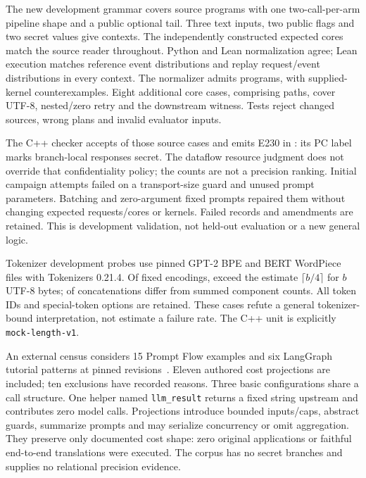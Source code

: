 \documentclass[preprint,12pt,a4paper]{elsarticle}
\begin{document}
The new development grammar covers \evDataflowSourcePrograms{} source programs
with one two-call-per-arm pipeline shape and a public optional tail. Three text
inputs, two public flags and two secret values give
\evDataflowExecutionContexts{} contexts. The independently constructed expected
cores match the source reader throughout. Python and Lean normalization agree;
Lean execution matches reference event distributions and replay request/event
distributions in every context. The normalizer admits \evDataflowAccepted{}
programs, with \evDataflowAcceptedFiniteCounterexamples{} supplied-kernel
counterexamples. Eight additional core cases, comprising
\evDataflowBoundaryPaths{} paths, cover UTF-8, nested/zero retry and the downstream
witness. Tests reject \evDataflowSourceTampersRejected{} changed sources,
\evDataflowAlteredPlansRejected{} wrong plans and
\evDataflowInvalidEvaluatorInputsRejected{} invalid evaluator inputs.

The C++ checker accepts \evDataflowCppAccepted{} of those source cases and emits
E230 in \evDataflowCppSecretArgumentCases{}: its PC label marks branch-local responses
secret. The dataflow resource judgment does not override that confidentiality
policy; the counts are not a precision ranking. Initial campaign attempts failed
on a transport-size guard and unused prompt parameters. Batching and zero-argument
fixed prompts repaired them without changing expected requests/cores or kernels.
Failed records and amendments are retained. This is development validation,
not held-out evaluation or a new general logic.

Tokenizer development probes use pinned GPT-2 BPE and BERT WordPiece files with
Tokenizers 0.21.4. Of \evTokenizerEncodings{} fixed encodings,
\evUnderestimates{} exceed the estimate $\lceil b/4\rceil$ for $b$ UTF-8 bytes;
\evNonadditive{} of \evConcatenations{} concatenations differ from summed
component counts. All token IDs and special-token options are retained. These
cases refute a general tokenizer-bound interpretation, not estimate a failure
rate. The C++ unit is explicitly \texttt{mock-length-v1}.

An external census considers 15 Prompt Flow examples and six LangGraph tutorial
patterns at pinned revisions~\cite{promptflow,langgraph}. Eleven authored cost
projections are included; ten exclusions have recorded reasons. Three basic
configurations share a call structure. One helper named \texttt{llm\_result}
returns a fixed string upstream and contributes zero model calls. Projections
introduce bounded inputs/caps, abstract guards, summarize prompts and may
serialize concurrency or omit aggregation. They preserve only documented cost
shape: zero original applications or faithful end-to-end translations were
executed. The corpus has no secret branches and supplies no relational
precision evidence.
\end{document}
